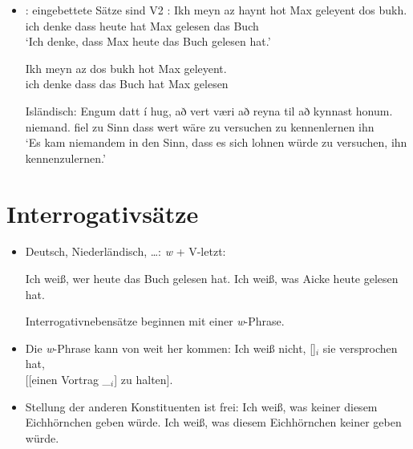 

\begin{itemize}
\item {}: eingebettete Sätze sind V2 \citep[]{Diesing90a}:
\eal
\ex
\gll Ikh meyn  az   haynt hot Max geleyent dos bukh.\footnotemark\\
     ich   denke dass heute hat Max gelesen   das Buch\\
\glt `Ich denke, dass Max heute das Buch gelesen hat.'

\ex%
\gll Ikh meyn  az   dos bukh hot Max geleyent.\\
     ich denke dass das Buch hat Max gelesen\\

\zl

Isländisch:
\ea
\gll Engum         datt í hug,  að   vert  væri að reyna til     að kynnast honum.\footnotemark\\
     niemand.\DAT{} fiel zu Sinn dass wert wäre zu versuchen \PREP{} zu kennenlernen ihn\\%
{}
\glt `Es kam niemandem in den Sinn, dass es sich lohnen würde zu versuchen, ihn kennenzulernen.'
\z

\end{itemize}

\section{Interrogativsätze}

\begin{itemize}
\item Deutsch, Niederländisch, \ldots: \emph{w} + V-letzt:

\eal
\ex Ich weiß, wer heute das Buch gelesen hat.
\ex Ich weiß, was Aicke heute gelesen hat.
\zl

Interrogativnebensätze beginnen mit einer \emph{w}-Phrase.

\item Die \emph{w}-Phrase kann von weit her kommen:
\ea
Ich weiß nicht, []$_i$ sie versprochen hat,\\
{}[[einen Vortrag \_$_i$] zu halten].
\z

\item Stellung der anderen Konstituenten ist frei:
\eal
\ex Ich weiß, was keiner diesem Eichhörnchen geben würde.
\ex Ich weiß, was diesem Eichhörnchen keiner geben würde.
\zl

\end{itemize}


